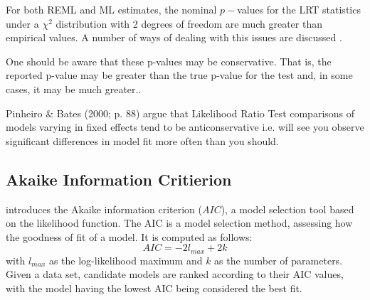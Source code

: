 \documentclass[12pt, a4paper]{report}
\theoremstyle{plain}
\theoremstyle{definition}
\theoremstyle{remark}
\begin{document}
	For both REML and ML estimates, the nominal $p-$values for the LRT statistics under a $\chi^2$ distribution with 2 degrees of freedom are much greater than empirical values. A number of ways of dealing with this issues are discussed \citep[pg.86]{pb}.
	
	One should be aware that these p-values may be conservative. That is, the reported p-value may be greater than the true p-value for the test and, in some cases, it may be much greater.\citep[pg.87]{pb}.
	
	
	
	Pinheiro \& Bates (2000; p. 88) argue that Likelihood Ratio Test comparisons of models varying in fixed effects tend to be anticonservative i.e. 
	will see you observe significant differences in model fit more often than you should. 
	
	
	
	
	\subsection{Akaike Information Critierion}
	\citet{akaike} introduces the Akaike information criterion ($AIC$), a model selection tool based on the likelihood function. The AIC is a model selection method, assessing how the goodness of
	fit of a model. It is computed as follows:
	\begin{displaymath}
	AIC = -2l_{max}+ 2k
	\end{displaymath}
	with $l_{max}$ as the log-likelihood maximum and $k$ as the number
	of parameters. Given a data set, candidate models are ranked according to their AIC values, with the model having the lowest AIC being considered the best fit.
	
\end{document}
